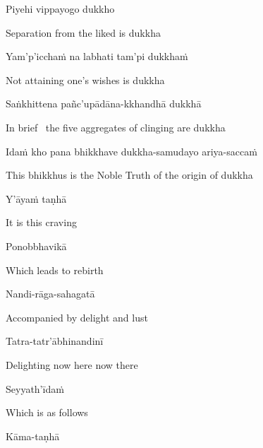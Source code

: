 Piyehi vippayogo dukkho

\begin{english}
  Separation from the liked is dukkha
\end{english}

Yam'p'icchaṁ na labhati tam'pi dukkhaṁ

\begin{english}
  Not attaining one's wishes is dukkha
\end{english}

Saṅkhittena pañc'upādāna-kkhandhā dukkhā

\begin{english}
  In brief \breathmark\ the five aggregates of clinging are dukkha\makeatletter\hyperlink{endnote54-appendix}\makeatother
\end{english}

Idaṁ kho pana bhikkhave dukkha-samudayo ariya-saccaṁ

\begin{english}
  This bhikkhus is the Noble Truth of the origin of dukkha
\end{english}

Y'āyaṁ taṇhā

\begin{english}
  It is this craving
\end{english}

Ponobbhavikā

\begin{english}
  Which leads to rebirth
\end{english}

Nandi-rāga-sahagatā

\begin{english}
  Accompanied by delight and lust
\end{english}

Tatra-tatr'ābhinandinī

\begin{english}
  Delighting now here now there
\end{english}

Seyyath'īdaṁ

\begin{english}
  Which is as follows
\end{english}

Kāma-taṇhā


